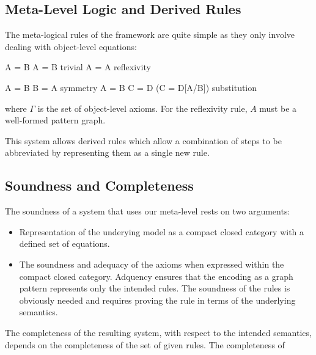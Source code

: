 \documentclass[runningheads]{llncs}
\begin{document}
\subsection{Meta-Level Logic and Derived Rules}

The meta-logical rules of the framework are quite simple as they only
involve dealing with object-level equations:

\begin{center}
\prooftree
A = B \in \Gamma
\justifies
\Gamma \vdash A = B
\using\mbox{trivial}
\endprooftree
\quad\quad
\prooftree
\justifies
\Gamma \vdash A = A
\using\mbox{reflexivity}
\endprooftree
\end{center}

\begin{center}
\prooftree
\Gamma \vdash A = B
\justifies
\Gamma \vdash B = A
\using\mbox{symmetry}
\endprooftree
\quad\quad
\prooftree
\Gamma \vdash A = B
\Gamma \vdash C = D
\justifies
\Gamma \vdash (C = D[A/B])
\using\mbox{substitution}
\endprooftree
\end{center}

\noindent where $\Gamma$ is the set of object-level axioms. For the
reflexivity rule, $A$ must be a well-formed pattern graph. 

This system allows derived rules which allow a combination of steps to
be abbreviated by representing them as a single new rule. 

\subsection{Soundness and Completeness} 

The soundness of a system that uses our meta-level rests on two
arguments: 

\begin{itemize}
\item Representation of the underying model as a compact closed
  category with a defined set of equations.

\item The soundness and adequacy of the axioms when expressed within
  the compact closed category. Adquency ensures that the encoding as a
  graph pattern represents only the intended rules.  The soundness of
  the rules is obviously needed and requires proving the rule in terms
  of the underlying semantics.
\end{itemize}

The completeness of the resulting system, with respect to the intended
semantics, depends on the completeness of the set of given rules. The
completeness of 
\end{document}
